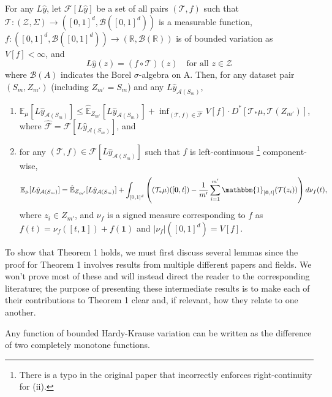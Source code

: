\documentclass{article}
\newenvironment{manualtheorem}[1]{%
  \renewcommand\themanualtheoreminner{#1}%
  \manualtheoreminner
}{\endmanualtheoreminner}
\newenvironment{manuallemma}[1]{%
  \renewcommand\themanuallemmainner{#1}%
  \manuallemmainner
}{\endmanualtheoreminner}
\begin{document}
\begin{manualtheorem}{1}
    For any $L\hat{y}$, let $\mathcal{F}[L\hat{y}]$ be a set of all pairs $(\mathcal{T}, f)$ such that $\mathcal{T}: (\mathcal{Z}, \Sigma) \rightarrow ([0, 1]^d, \mathcal{B}([0, 1]^d))$ is a measurable function, $f: ([0, 1]^d, \mathcal{B}([0, 1]^d)) \rightarrow (\mathbb{R}, \mathcal{B}(\mathbb{R}))$ is of bounded variation as $V[f] < \infty$, and
    \[L \hat{y}(z) = (f \circ \mathcal{T})(z) \quad \text{for all } z\in \mathcal{Z}\]
    where $\mathcal{B}(A)$ indicates the Borel $\sigma$-algebra on A. Then, for any dataset pair $(S_m, Z_{m'})$ (including $Z_{m'} = S_m$) and any $L \hat{y}_{\mathcal{A}(S_m)}$,
    \begin{enumerate}[label=(\roman*)]
        \item $\mathbb{E}_{\mu} [L \hat{y}_{\mathcal{A}(S_m)}] \leq \hat{\mathbb{E}}_{Z_{m'}} [L \hat{y}_{\mathcal{A}(S_m)}] + \inf_{(\mathcal{T}, f) \in \hat{\mathcal{F}}} V[f] \cdot D^* [\mathcal{T}_{*}\mu, \mathcal{T}(Z_{m'})]$, where $\hat{\mathcal{F}} = \mathcal{F}[L \hat{y}_{\mathcal{A}(S_m)}]$, and

        \item for any $(\mathcal{T}, f) \in \mathcal{F}[L \hat{y}_{\mathcal{A}(S_m)}]$ such that $f$ is left-continuous {\color{red}\footnote{There is a typo in the original paper that incorrectly enforces right-continuity for (ii).}} component-wise,
        \[\mathbb{E}_{\mu} [L \hat{y}_{\mathcal{A}(S_m)}] = \hat{\mathbb{E}}_{Z_{m'}}[L \hat{y}_{\mathcal{A}(S_m)}] + \int_{[0, 1]^d} \left( (\mathcal{T}_{*}\mu)([\mathbf{0}, t]) - \frac{1}{m'} \sum_{i=1}^{m'} \mathbbm{1}_{[\mathbf{0}, t]} (\mathcal{T}(z_i))\right) d\nu_f (t),\]
        where $z_i \in Z_{m'}$, and $\nu_f$ is a signed measure corresponding to $f$ as $f(t) = \nu_f ([t, \mathbf{1}]) + f(\mathbf{1})$ and $\left|\nu_f \right| ([0, 1]^d) = V[f]$.
    \end{enumerate}
\end{manualtheorem}

To show that Theorem 1 holds, we must first discuss several lemmas since the proof for Theorem 1 involves results from multiple different papers and fields. We won't prove most of these and will instead direct the reader to the corresponding literature; the purpose of presenting these intermediate results is to make each of their contributions to Theorem 1 clear and, if relevant, how they relate to one another.

\begin{manuallemma}{1.1}[Corollary 3 in \cite{leonov1996}]
    Any function of bounded Hardy-Krause variation can be written as the difference of two completely monotone functions.
\end{manuallemma}
\end{document}
